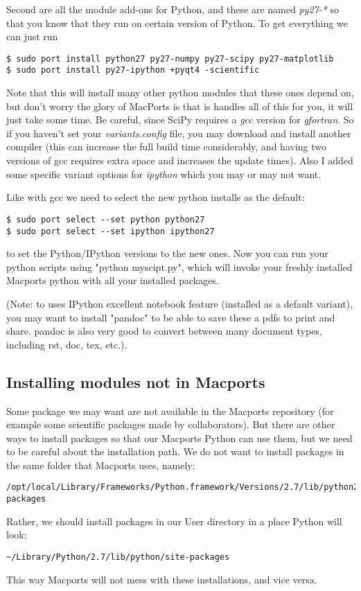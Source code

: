 \documentclass[11pt]{article}
\begin{document}
Second are all the module add-ons for Python, and these are named \textit{py27-*} so that you know that they run on certain version of Python. To get everything we can just run
\begin{lstlisting}[style=Bash]
$ sudo port install python27 py27-numpy py27-scipy py27-matplotlib
$ sudo port install py27-ipython +pyqt4 -scientific
\end{lstlisting}
Note that this will install many other python modules that these ones depend on, but don't worry the glory of MacPorts is that is handles all of this for you, it will just take some time. Be careful, since SciPy requires a \textit{gcc} version for \textit{gfortran}. So if you haven't set your \textit{variants.config} file, you may download and install another compiler (this can increase the full build time considerably, and having two versions of gcc requires extra space and increases the update times). Also I added some specific variant options for {\it ipython} which you may or may not want. 

Like with gcc we need to select the new python installs as the default:
\begin{lstlisting}[style=Bash]
$ sudo port select --set python python27
$ sudo port select --set ipython ipython27
\end{lstlisting}
to set the Python/IPython versions to the new ones. Now you can run your python scripts using "python myscipt.py", which will invoke your freshly installed Macports python with all your installed packages.

(Note: to uses IPython excellent notebook feature (installed as a default variant), you may want to install "pandoc" to be able to save these a pdfs to print and share. pandoc is also very good to convert between many document types, including rst, doc, tex, etc.).



\subsection{Installing modules not in Macports}
Some package we may want are not available in the Macports repository (for example some scientific packages made by collaborators). But there are other ways to install packages so that our Macports Python can use them, but we need to be careful about the installation path. We do not want to install packages in the same folder that Macports uses, namely:
\begin{lstlisting}[style=Bash]
/opt/local/Library/Frameworks/Python.framework/Versions/2.7/lib/python2.7/site-packages
\end{lstlisting}
Rather, we should install packages in our User directory in a place Python will look:
\begin{lstlisting}[style=Bash]
~/Library/Python/2.7/lib/python/site-packages
\end{lstlisting}
This way Macports will not mess with these installations, and vice versa. 
\end{document}
